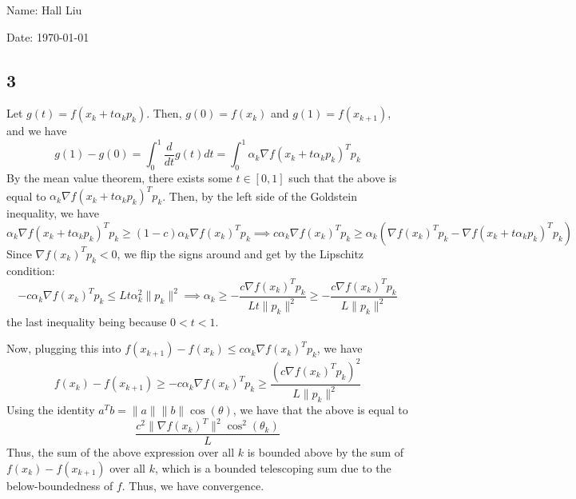 \documentclass{article}
\begin{document}
Name: Hall Liu

Date: \today 
\vspace{1.5cm}

\subsection*{3}
Let $g(t)=f(x_k+t\alpha_kp_k)$. Then, $g(0)=f(x_k)$ and $g(1)=f(x_{k+1})$, and we have 
\[g(1)-g(0)=\int_0^1\frac{d}{dt}g(t)dt=\int_0^1\alpha_k\nabla f(x_k+t\alpha_kp_k)^Tp_k\]
By the mean value theorem, there exists some $t\in[0,1]$ such that the above is equal to $\alpha_k\nabla f(x_k+t\alpha_kp_k)^Tp_k$. Then, by the left side of the Goldstein inequality, we have
\[\alpha_k\nabla f(x_k+t\alpha_kp_k)^Tp_k\geq(1-c)\alpha_k\nabla f(x_k)^Tp_k\implies c\alpha_k\nabla f(x_k)^Tp_k\geq\alpha_k(\nabla f(x_k)^Tp_k-\nabla f(x_k+t\alpha_kp_k)^Tp_k)\]
Since $\nabla f(x_k)^Tp_k<0$, we flip the signs around and get by the Lipschitz condition:
\[-c\alpha_k\nabla f(x_k)^Tp_k\leq Lt\alpha_k^2\|p_k\|^2\implies \alpha_k\geq-\frac{c\nabla f(x_k)^Tp_k}{Lt\|p_k\|^2}\geq-\frac{c\nabla f(x_k)^Tp_k}{L\|p_k\|^2}\]
the last inequality being because $0<t<1$.

Now, plugging this into $f(x_{k+1})-f(x_k)\leq c\alpha_k\nabla f(x_k)^Tp_k$, we have
\[f(x_{k})-f(x_{k+1})\geq-c\alpha_k\nabla f(x_k)^Tp_k\geq\frac{(c\nabla f(x_k)^Tp_k)^2}{L\|p_k\|^2}\]
Using the identity $a^Tb=\|a\|\|b\|\cos(\theta)$, we have that the above is equal to 
\[\frac{c^2\|\nabla f(x_k)^T\|^2\cos^2(\theta_k)}{L}\]
Thus, the sum of the above expression over all $k$ is bounded above by the sum of $f(x_k)-f(x_{k+1})$ over all $k$, which is a bounded telescoping sum due to the below-boundedness of $f$. Thus, we have convergence.
\end{document}
